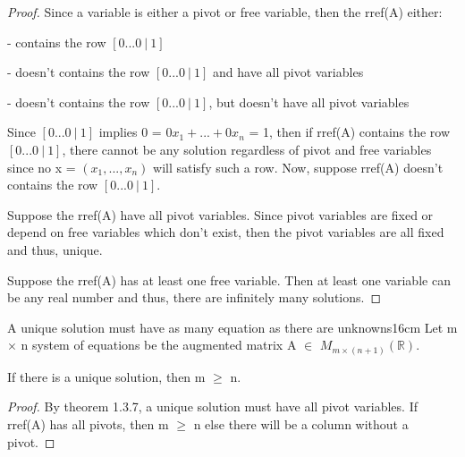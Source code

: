     \begin{proof}
        Since a variable is either a pivot or free variable,
        then the rref(A) either:
        
        \hspace{0.5cm}
        - contains the row $[0 ... 0 \ | \ 1]$

        \hspace{0.5cm}
        - doesn't contains the row $[0 ... 0 \ | \ 1]$
        and have all pivot variables

        \hspace{0.5cm}
        - doesn't contains the row $[0 ... 0 \ | \ 1]$,
        but doesn't have all pivot variables

        Since $[0 ... 0 \ | \ 1]$ implies 0 = $0x_1 + ... + 0x_n$ = 1,
        then if rref(A) contains the row $[0 ... 0 \ | \ 1]$,
        there cannot be any solution regardless of pivot and free
        variables since no x = $(x_1,...,x_n)$ will satisfy such a row.
        Now, suppose rref(A) doesn't contains the row $[0 ... 0 \ | \ 1]$.
        
        Suppose the rref(A) have all pivot variables.
        Since pivot variables are fixed or depend on free
        variables which don't exist, then the pivot variables are all fixed
        and thus, unique.

        Suppose the rref(A) has at least one free variable.
        Then at least one variable can be any real number and thus,
        there are infinitely many solutions.
    \end{proof}

    \newpage



    \begin{corollary}{A unique solution must have as many equation as there
    are unknowns}{16cm}
        Let m $\times$ n system of equations be the
        augmented matrix A $\in$ $M_{m \times (n+1)}(\mathbb{R})$.

        If there is a unique solution, then m $\geq$ n.
    \end{corollary}

    \begin{proof}
        By {\color{red} theorem 1.3.7}, a unique solution must
        have all pivot variables. If rref(A) has all pivots,
        then m $\geq$ n else there will be a column without a pivot.
    \end{proof}

    \vspace{0.5cm}



